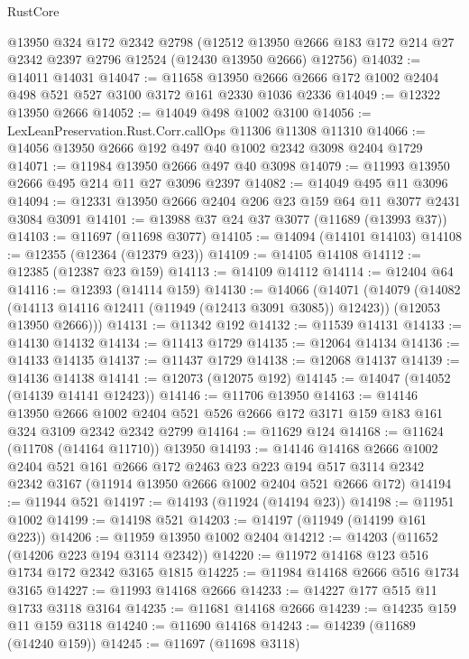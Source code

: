 \begin{lexlean}{RustCore}
\begin{coremodule}
    @13950
    @324
    @172
    @2342
    @2798
    (@12512 @13950 @2666 @183 @172 @214 @27 @2342 @2397 @2796 @12524 (@12430 @13950 @2666) @12756)
@14032 := @14011 @14031
@14047 := @11658
    @13950
    @2666
    @2666
    @172
    @1002
    @2404
    @498
    @521
    @527
    @3100
    @3172
    @161
    @2330
    @1036
    @2336
@14049 := @12322 @13950 @2666
@14052 := @14049 @498 @1002 @3100
@14056 := LexLeanPreservation.Rust.Corr.callOps @11306 @11308 @11310
@14066 := @14056 @13950 @2666 @192 @497 @40 @1002 @2342 @3098 @2404 @1729
@14071 := @11984 @13950 @2666 @497 @40 @3098
@14079 := @11993 @13950 @2666 @495 @214 @11 @27 @3096 @2397
@14082 := @14049 @495 @11 @3096
@14094 := @12331 @13950 @2666 @2404 @206 @23 @159 @64 @11 @3077 @2431 @3084 @3091
@14101 := @13988 @37 @24 @37 @3077 (@11689 (@13993 @37))
@14103 := @11697 (@11698 @3077)
@14105 := @14094 (@14101 @14103)
@14108 := @12355 (@12364 (@12379 @23))
@14109 := @14105 @14108
@14112 := @12385 (@12387 @23 @159)
@14113 := @14109 @14112
@14114 := @12404 @64
@14116 := @12393 (@14114 @159)
@14130 := @14066
    (@14071
      (@14079
        (@14082 (@14113 @14116 @12411 (@11949 (@12413 @3091 @3085)) @12423))
        (@12053 @13950 @2666)))
@14131 := @11342 @192
@14132 := @11539 @14131
@14133 := @14130 @14132
@14134 := @11413 @1729
@14135 := @12064 @14134
@14136 := @14133 @14135
@14137 := @11437 @1729
@14138 := @12068 @14137
@14139 := @14136 @14138
@14141 := @12073 (@12075 @192)
@14145 := @14047 (@14052 (@14139 @14141 @12423))
@14146 := @11706 @13950
@14163 := @14146
    @13950
    @2666
    @1002
    @2404
    @521
    @526
    @2666
    @172
    @3171
    @159
    @183
    @161
    @324
    @3109
    @2342
    @2342
    @2799
@14164 := @11629 @124
@14168 := @11624 (@11708 (@14164 @11710)) @13950
@14193 := @14146
    @14168
    @2666
    @1002
    @2404
    @521
    @161
    @2666
    @172
    @2463
    @23
    @223
    @194
    @517
    @3114
    @2342
    @2342
    @3167
    (@11914 @13950 @2666 @1002 @2404 @521 @2666 @172)
@14194 := @11944 @521
@14197 := @14193 (@11924 (@14194 @23))
@14198 := @11951 @1002
@14199 := @14198 @521
@14203 := @14197 (@11949 (@14199 @161 @223))
@14206 := @11959 @13950 @1002 @2404
@14212 := @14203 (@11652 (@14206 @223 @194 @3114 @2342))
@14220 := @11972 @14168 @123 @516 @1734 @172 @2342 @3165 @1815
@14225 := @11984 @14168 @2666 @516 @1734 @3165
@14227 := @11993 @14168 @2666
@14233 := @14227 @177 @515 @11 @1733 @3118 @3164
@14235 := @11681 @14168 @2666
@14239 := @14235 @159 @11 @159 @3118
@14240 := @11690 @14168
@14243 := @14239 (@11689 (@14240 @159))
@14245 := @11697 (@11698 @3118)

\end{coremodule}
\end{lexlean}

